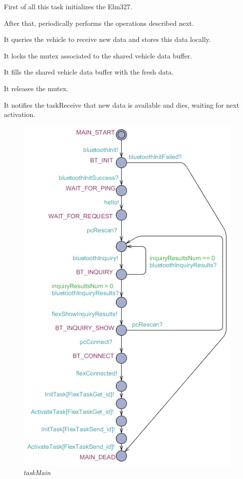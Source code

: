 \documentclass[paper=a4, fontsize=11pt]{scrartcl} %
\numberwithin{equation}{section} %
\numberwithin{figure}{section} %
\numberwithin{table}{section} %
\begin{document}
First of all this task initializes the Elm327.

After that, periodically performs the operations described next.

It queries the vehicle to receive new data and stores this data locally.

It locks the mutex associated to the shared vehicle data buffer.

It fills the shared vehicle data buffer with the fresh data.

It releases the mutex.

It notifies the taskReceive that new data is available and dies, waiting for next activation.

\begin{figure}[H]
  \centering
  \includegraphics[width=5in]{img/FLEX-PC_taskMain}
  \caption{\textit{taskMain}}
\end{figure}
\end{document}
